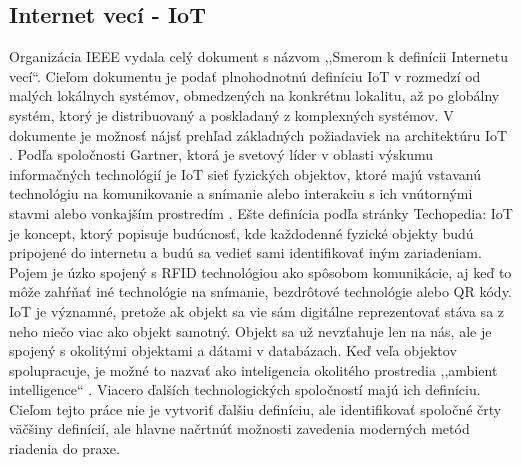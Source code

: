 \subsection{Internet vecí - IoT}
Organizácia IEEE vydala celý dokument  s názvom ,,Smerom k definícii Internetu vecí``. Cieľom dokumentu je podať plnohodnotnú definíciu IoT v rozmedzí od malých lokálnych systémov, obmedzených na konkrétnu lokalitu, až po globálny systém, ktorý je distribuovaný a poskladaný z komplexných systémov. V dokumente je možnosť nájsť prehľad základných požiadaviek na architektúru IoT \cite{IOT16}.
Podľa spoločnosti Gartner, ktorá je svetový líder v oblasti výskumu informačných technológií je IoT sieť fyzických objektov, ktoré majú vstavanú technológiu na komunikovanie a snímanie alebo interakciu s ich vnútornými stavmi alebo vonkajším prostredím \cite{IOT17}. 
Ešte definícia podľa stránky Techopedia: IoT je koncept, ktorý popisuje budúcnosť, kde každodenné fyzické objekty budú pripojené do internetu a budú sa vedieť sami identifikovať iným zariadeniam. Pojem je úzko spojený s RFID technológiou ako spôsobom komunikácie, aj keď to môže zahŕňať iné technológie na snímanie, bezdrôtové technológie alebo QR kódy.\\
\indent IoT je významné, pretože ak objekt sa vie sám digitálne reprezentovať stáva sa z neho niečo viac ako objekt samotný. Objekt sa už nevzťahuje len na nás, ale je spojený s okolitými objektami a dátami v databázach. Keď veľa objektov spolupracuje, je možné to nazvať ako inteligencia okolitého prostredia ,,ambient intelligence`` \cite{IOT18}.
Viacero ďalších technologických spoločností majú ich definíciu. Cieľom tejto práce nie je vytvoriť ďalšiu definíciu, ale identifikovať spoločné črty väčšiny definícií, ale hlavne načrtnúť možnosti zavedenia moderných metód riadenia do praxe. 
